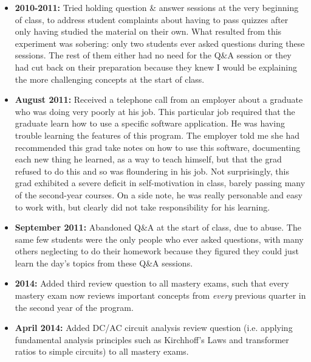 \begin{itemize}
\vskip 10pt
\item{} {\bf 2010-2011:} Tried holding question \& answer sessions at the very beginning of class, to address student complaints about having to pass quizzes after only having studied the material on their own.  What resulted from this experiment was sobering: only two students ever asked questions during these sessions.  The rest of them either had no need for the Q\&A session or they had cut back on their preparation because they knew I would be explaining the more challenging concepts at the start of class.
\vskip 10pt
\item{} {\bf August 2011:} Received a telephone call from an employer about a graduate who was doing very poorly at his job.  This particular job required that the graduate learn how to use a specific software application.  He was having trouble learning the features of this program.  The employer told me she had recommended this grad take notes on how to use this software, documenting each new thing he learned, as a way to teach himself, but that the grad refused to do this and so was floundering in his job.  Not surprisingly, this grad exhibited a severe deficit in self-motivation in class, barely passing many of the second-year courses.  On a side note, he was really personable and easy to work with, but clearly did not take responsibility for his learning.
\vskip 10pt
\item{} {\bf September 2011:} Abandoned Q\&A at the start of class, due to abuse.  The same few students were the only people who ever asked questions, with many others neglecting to do their homework because they figured they could just learn the day's topics from these Q\&A sessions.
\vskip 10pt
\item{} {\bf 2014:} Added third review question to all mastery exams, such that every mastery exam now reviews important concepts from {\it every} previous quarter in the second year of the program.
\vskip 10pt
\item{} {\bf April 2014:} Added DC/AC circuit analysis review question (i.e. applying fundamental analysis principles such as Kirchhoff's Laws and transformer ratios to simple circuits) to all mastery exams.
\vskip 10pt

\end{itemize}
